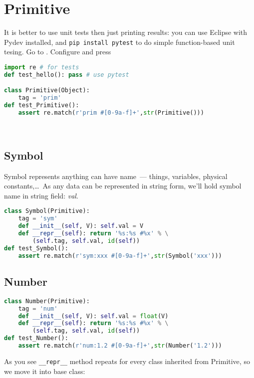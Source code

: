 \section{Primitive}

It is better to use unit tests then just printing results: you can use Eclipse
with Pydev installed, and \verb|pip install pytest| to do simple function-based
unit tesing. Go to
. Configure  and press

\bigskip
\begin{lstlisting}[language=Python]
import re # for tests
def test_hello(): pass # use pytest

class Primitive(Object):
    tag = 'prim'
def test_Primitive():
    assert re.match(r'prim #[0-9a-f]+',str(Primitive()))
\end{lstlisting}

\ \\

\subsection{Symbol}

Symbol represents anything can have name\ --- things, variables,
physical constants,\ldots\ As any data can be represented in string form, we'll
hold symbol name in string field: \emph{val}.


\begin{lstlisting}[language=Python]
class Symbol(Primitive):
    tag = 'sym'
    def __init__(self, V): self.val = V
    def __repr__(self): return '%s:%s #%x' % \
    	(self.tag, self.val, id(self))
def test_Symbol():
    assert re.match(r'sym:xxx #[0-9a-f]+',str(Symbol('xxx')))
\end{lstlisting}

\subsection{Number}


\begin{lstlisting}[language=Python]
class Number(Primitive):
    tag = 'num'
    def __init__(self, V): self.val = float(V)
    def __repr__(self): return '%s:%s #%x' % \
    	(self.tag, self.val, id(self))
def test_Number():
    assert re.match(r'num:1.2 #[0-9a-f]+',str(Number('1.2')))
\end{lstlisting}
As you see \verb|__repr__| method repeats for every class inherited from
Primitive, so we move it into base class:
 

